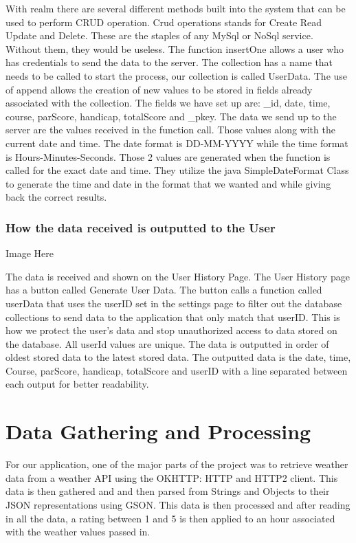 With realm there are several different methods built into the system that can be used to perform CRUD operation. Crud operations stands for Create Read Update and Delete. These are the staples of any MySql or NoSql service. Without them, they would be useless. The function insertOne allows a user who has credentials to send the data to the server.
\newline
The collection has a name that needs to be called to start the process, our collection is called UserData. The use of append allows the creation of new values to be stored in fields already associated with the collection. The fields we have set up are: \_id, date, time, course, parScore, handicap, totalScore and \_pkey. The data we send up to the server are the values received in the function call. Those values along with the current date and time. The date format is DD-MM-YYYY while the time format is Hours-Minutes-Seconds. Those 2 values are generated when the function is called for the exact date and time. They utilize the java SimpleDateFormat Class to generate the time and date in the format that we wanted and while giving back the correct results.
\subsubsection{How the data received is outputted to the User}

Image Here

The data is received and shown on the User History Page. The User History page has a button called Generate User Data. The button calls a function called userData that uses the userID set in the settings page to filter out the database collections to send data to the application that only match that userID. This is how we protect the user's data and stop unauthorized access to data stored on the database. All userId values are unique. The data is outputted in order of oldest stored data to the latest stored data. The outputted data is the date, time, Course, parScore, handicap, totalScore and userID with a line separated between each output for better readability.

\section{Data Gathering and Processing}
For our application, one of the major parts of the project was to retrieve weather data from a weather API using the OKHTTP: HTTP and HTTP2 client. This data is then gathered and and then parsed from Strings and Objects to their JSON representations using GSON. This data is then processed and after reading in all the data, a rating between 1 and 5 is then applied to an hour associated with the weather values passed in.

